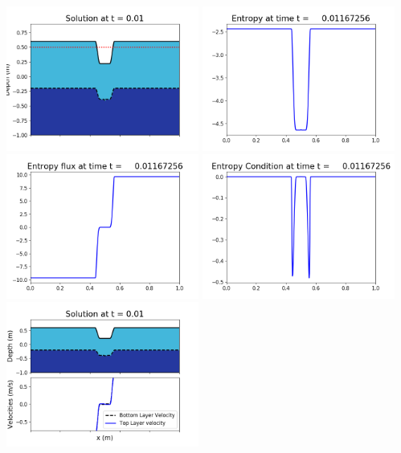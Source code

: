 \documentclass[11pt]{article}
\begin{document}
\includegraphics[width=0.475\textwidth]{frame0033fig1006.png}
\vskip 10pt 
\includegraphics[width=0.475\textwidth]{frame0033fig1007.png}
\includegraphics[width=0.475\textwidth]{frame0033fig1008.png}
\vskip 10pt 
\includegraphics[width=0.475\textwidth]{frame0033fig1009.png}
\vskip 10pt 
\includegraphics[width=0.475\textwidth]{frame0034fig1001.png}
\end{document}
